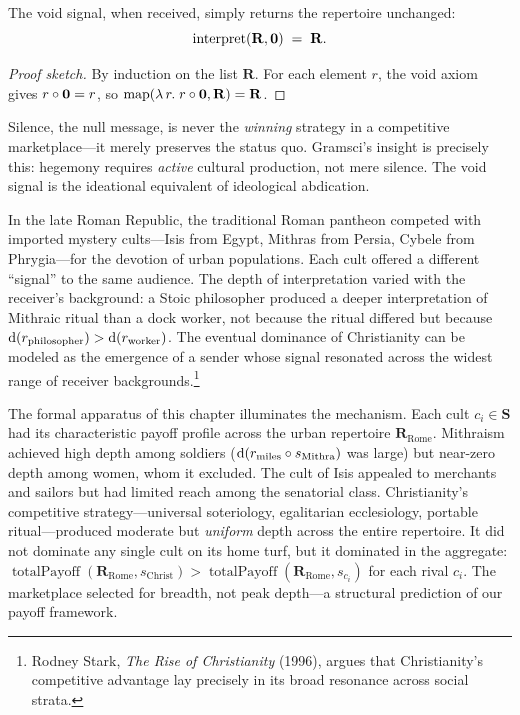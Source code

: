 \begin{theorem}
\label{thm:void-dom-identity}
The void signal, when received, simply returns the repertoire unchanged:
\[
  \operatorname{interpret}(\mathbf{R}, \mathbf{0}) \;=\; \mathbf{R}.
\]
\end{theorem}

\begin{proof}[Proof sketch]
By induction on the list $\mathbf{R}$.  For each element $r$, the void
axiom gives $r \circ \mathbf{0} = r$, so
$\operatorname{map}(\lambda\, r.\; r \circ \mathbf{0}, \mathbf{R}) = \mathbf{R}$.
\end{proof}

Silence, the null message, is never the \emph{winning} strategy in a
competitive marketplace---it merely preserves the status quo.  Gramsci's
insight is precisely this: hegemony requires \emph{active} cultural
production, not mere silence.  The void signal is the ideational equivalent
of ideological abdication.

\begin{example}
In the late Roman Republic, the traditional Roman pantheon competed with
imported mystery cults---Isis from Egypt, Mithras from Persia, Cybele from
Phrygia---for the devotion of urban populations. Each cult offered a
different ``signal'' to the same audience. The depth of interpretation
varied with the receiver's background: a Stoic philosopher produced a
deeper interpretation of Mithraic ritual than a dock worker, not because
the ritual differed but because $\operatorname{d}(r_{\text{philosopher}}) >
\operatorname{d}(r_{\text{worker}})$. The eventual dominance of Christianity can be
modeled as the emergence of a sender whose signal resonated across the
widest range of receiver backgrounds.\footnote{Rodney Stark,
\textit{The Rise of Christianity} (1996), argues that Christianity's
competitive advantage lay precisely in its broad resonance across social
strata.}

The formal apparatus of this chapter illuminates the mechanism.  Each cult
$c_i \in \mathbf{S}$ had its characteristic payoff profile across the
urban repertoire $\mathbf{R}_{\text{Rome}}$.  Mithraism achieved high depth
among soldiers ($\operatorname{d}(r_{\text{miles}} \circ s_{\text{Mithra}})$ was
large) but near-zero depth among women, whom it excluded.  The cult of Isis
appealed to merchants and sailors but had limited reach among the
senatorial class.  Christianity's competitive strategy---universal
soteriology, egalitarian ecclesiology, portable ritual---produced moderate
but \emph{uniform} depth across the entire repertoire.  It did not dominate
any single cult on its home turf, but it dominated in the aggregate:
$\operatorname{totalPayoff}(\mathbf{R}_{\text{Rome}}, s_{\text{Christ}}) >
\operatorname{totalPayoff}(\mathbf{R}_{\text{Rome}}, s_{c_i})$ for each
rival $c_i$.  The marketplace selected for breadth, not peak depth---a
structural prediction of our payoff framework.
\end{example}

